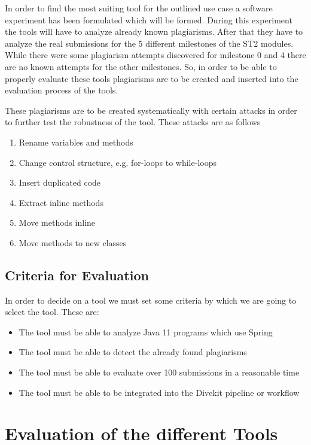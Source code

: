 \documentclass[a4paper, 11pt]{article}
\renewcommand{\\}{\vspace*{0.5\baselineskip} \newline}
\begin{document}
In order to find the most suiting tool for the outlined use case a software experiment has been formulated which will be formed. During this experiment
the tools will have to analyze already known plagiarisms. After that they have to analyze the real submissions for the 5 different milestones of the
ST2 modules. While there were some plagiarism attempts discovered for milestone 0 and 4 there are no known attempts for the other milestones. So, in order
to be able to properly evaluate these tools plagiarisms are to be created and inserted into the evaluation process of the tools.

These plagiarisms are to be created systematically with certain attacks in order to further test the robustness of the tool. These attacks are as follows
\begin{enumerate}
	\item Rename variables and methods
	\item Change control structure, e.g. for-loops to while-loops
	\item Insert duplicated code
	\item Extract inline methods
	\item Move methods inline
	\item Move methods to new classes
\end{enumerate}

\subsection{Criteria for Evaluation}

In order to decide on a tool we must set some criteria by which we are going to select the tool. These are:

\begin{itemize}
	\item The tool must be able to analyze Java 11 programs which use Spring
	\item The tool must be able to detect the already found plagiarisms
	\item The tool must be able to evaluate over 100 submissions in a reasonable time
	\item The tool must be able to be integrated into the Divekit pipeline or workflow
\end{itemize}

\clearpage

\section{Evaluation of the different Tools}
\label{sec:EvaluationOfTheDifferentTools}
\end{document}
